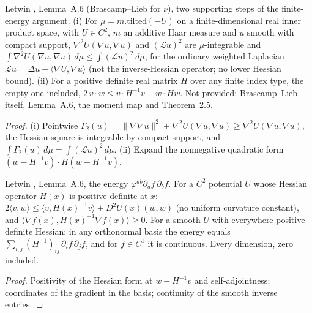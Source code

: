 \begin{lemma}
  \label{lem:letwin-finite-energy-supports}
  \leanok
  Letwin \cite{Letwin2026QuadraticKLS}, Lemma~A.6 (Brascamp--Lieb for $\nu$), two supporting steps of the finite-energy
  argument.  (i) For $\mu=m.\mathrm{tilted}(-U)$ on a finite-dimensional real inner product space, with $U\in C^2$, $m$ an
  additive Haar measure and $u$ smooth with compact support, $\nabla^2U(\nabla u,\nabla u)$ and $(\mathcal Lu)^2$ are
  $\mu$-integrable and $\int\nabla^2U(\nabla u,\nabla u)\,d\mu\le\int(\mathcal Lu)^2\,d\mu$, for the ordinary weighted
  Laplacian $\mathcal Lu=\Delta u-\langle\nabla U,\nabla u\rangle$ (not the inverse-Hessian operator; no lower Hessian
  bound).  (ii) For a positive definite real matrix $H$ over any finite index type, the empty one included,
  $2\,v\cdot w\le v\cdot H^{-1}v+w\cdot Hw$.  Not provided: Brascamp--Lieb itself, Lemma~A.6, the moment map and
  Theorem~2.5.
\end{lemma}
\begin{proof}
  \leanok
  (i) Pointwise $\Gamma_2(u)=\|\nabla\nabla u\|^2+\nabla^2U(\nabla u,\nabla u)\ge\nabla^2U(\nabla u,\nabla u)$, the Hessian
  square is integrable by compact support, and $\int\Gamma_2(u)\,d\mu=\int(\mathcal Lu)^2\,d\mu$.  (ii) Expand the
  nonnegative quadratic form $(w-H^{-1}v)\cdot H(w-H^{-1}v)$.
\end{proof}

\begin{lemma}
  \label{lem:letwin-inverse-hessian-energy}
  \leanok
  Letwin \cite{Letwin2026QuadraticKLS}, Lemma~A.6, the energy $\varphi^{ab}\partial_af\,\partial_bf$.  For a $C^2$ potential
  $U$ whose Hessian operator $H(x)$ is positive definite at $x$: $2\langle v,w\rangle\le\langle v,H(x)^{-1}v\rangle+D^2U(x)(w,w)$
  (no uniform curvature constant), and $\langle\nabla f(x),H(x)^{-1}\nabla f(x)\rangle\ge0$.  For a smooth $U$ with
  everywhere positive definite Hessian: in any orthonormal basis the energy equals
  $\sum_{i,j}(H^{-1})_{ij}\,\partial_if\,\partial_jf$, and for $f\in C^1$ it is continuous.  Every dimension, zero included.
\end{lemma}
\begin{proof}
  \leanok
  Positivity of the Hessian form at $w-H^{-1}v$ and self-adjointness; coordinates of the gradient in the basis; continuity
  of the smooth inverse entries.
\end{proof}

